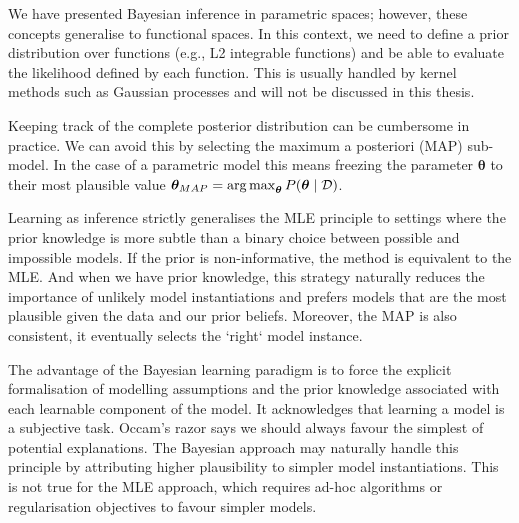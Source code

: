 We have presented Bayesian inference in parametric spaces; however, these concepts generalise to functional spaces. In this context, we need to define a prior distribution over functions (e.g., L2 integrable functions) and be able to evaluate the likelihood defined by each function. This is usually handled by kernel methods such as Gaussian processes and will not be discussed in this thesis.

Keeping track of the complete posterior distribution can be cumbersome in practice. We can avoid this by selecting the maximum a posteriori (MAP) sub-model. In the case of a parametric model this means freezing the parameter $\bm \theta$ to their most plausible value $\bm \theta_{MAP} = \operatorname*{arg\,max}_{\bm \theta} P(\bm \theta \mid \mathcal{D})$.

Learning as inference strictly generalises the MLE principle to settings where the prior knowledge is more subtle than a binary choice between possible and impossible models. If the prior is non-informative, the method is equivalent to the MLE. And when we have prior knowledge, this strategy naturally reduces the importance of unlikely model instantiations and prefers models that are the most plausible given the data and our prior beliefs. Moreover, the MAP is also consistent, it eventually selects the `right` model instance.

The advantage of the Bayesian learning paradigm is to force the explicit formalisation of modelling assumptions and the prior knowledge associated with each learnable component of the model. It acknowledges that learning a model is a subjective task. Occam's razor says we should always favour the simplest of potential explanations. The Bayesian approach may naturally handle this principle by attributing higher plausibility to simpler model instantiations. This is not true for the MLE approach, which requires ad-hoc algorithms or regularisation objectives to favour simpler models.

%
